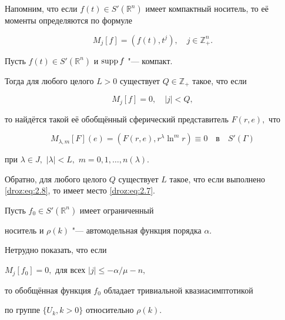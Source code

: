 \smallskip



Напомним, что если $f(t) \in S'(\mathbb R^n)$ имеет компактный носитель, то её моменты определяются по формуле

\begin{equation}

\label{droz:eq:2.6}

M_j[f]=(f(t),t^j),\quad j\in \mathbb Z_{+}^n.

\end{equation}



\smallskip

\begin{lemma}[1]

Пусть $f(t) \in S'(\mathbb R^n)$ и ${\rm supp\,} f$ "--- компакт{\rm.}

Тогда для любого целого $L>0$ существует $Q\in \mathbb Z_{+}$ такое{\rm,} что если 

\begin{equation}

\label{droz:eq:2.7}

M_j[f]=0,\quad |j|<Q,

\end{equation}

то найдётся такой её обобщённый сферический представитель $F(r,e),$ что 

\begin{equation}

\label{droz:eq:2.8}

M_{\lambda,m}[F](e)=(F(r,e),r^{\lambda}{\ln }^mr) \equiv 0 \text{ ~~в~~ } S'(\Gamma)

\end{equation}

при $\lambda \in J,$ $ |\lambda|<L,$ $m=0, 1, \dots,n(\lambda).$



Обратно{\rm,} для любого целого $Q$ существует $L$ такое{\rm,} что если выполнено \eqref{droz:eq:2.8}{\rm,} то имеет место \eqref{droz:eq:2.7}{\rm.}

\end{lemma}

\smallskip



\begin{remark} Пусть $f_0 \in S'(\mathbb R^n)$ имеет ограниченный

носитель и $\rho(k)$ "--- автомодельная функция порядка $\alpha.$

Нетрудно показать, что если



$M_j[f_0]=0,$ для всех $|j| \leq {-\alpha}/{\mu}-n,$


то обобщённая функция $f_0$ обладает тривиальной квазиасимптотикой

по группе $\{U_k, k>0\}$ относительно $\rho(k).$

\end{remark}



